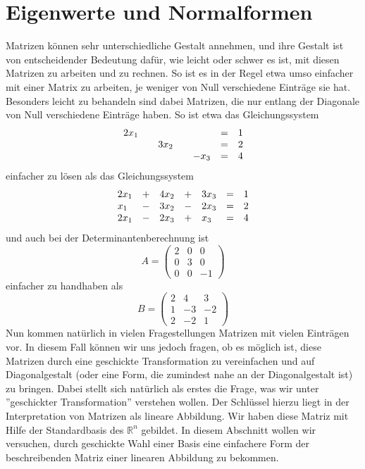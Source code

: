 
\chapter{Eigenwerte und Normalformen}\label{section_eigenwert}

\setcounter{definition}{0}
\setcounter{beispiel}{0}
\setcounter{notiz}{0}

Matrizen können sehr unterschiedliche Gestalt annehmen, und ihre Gestalt ist von 
entscheidender Bedeutung dafür, wie leicht oder schwer es ist, mit diesen Matrizen 
zu arbeiten und zu rechnen. So ist es in der Regel etwa umso einfacher mit einer 
Matrix zu arbeiten, je weniger von Null verschiedene Einträge sie hat. Besonders 
leicht zu behandeln sind dabei Matrizen, die nur entlang der Diagonale von Null 
verschiedene Einträge haben. So ist etwa das Gleichungssystem
  	$$ \begin{array} {l c l c l c l}
   	2 x_1 & & & & & = & 1 \\
   	& & 3 x_2 & & & = & 2 \\
   	& & & & - x_3 & = & 4
  	\end{array} $$
einfacher zu lösen als das Gleichungssystem
  	$$  \begin{array} {l c l c l c l}
   	2 x_1 & + & 4 x_2 & + & 3 x_3& = & 1 \\
   	x_1 & - & 3 x_2 & - & 2 x_3 & = & 2 \\
   	2x_1 & - & 2 x_3 & + & x_3 & = & 4
  	\end{array} $$
und auch bei der Determinantenberechnung ist 
  	$$ A = \left( \begin{matrix} 2 & 0 & 0 \\ 0 & 3 & 0 \\ 0 & 0 & -1 \end{matrix} \right) $$
einfacher zu handhaben als
  	$$ B = \left( \begin{matrix} 2 & 4 & 3 \\  1 & -3 & -2 \\ 2 & -2 & 1 \end{matrix} \right) $$ 
Nun kommen natürlich in vielen Fragestellungen Matrizen mit vielen Einträgen vor. 
In diesem Fall können wir uns jedoch fragen, ob es möglich ist, diese Matrizen 
durch eine geschickte Transformation zu vereinfachen und auf Diagonalgestalt (oder 
eine Form, die zumindest nahe an der Diagonalgestalt ist) zu bringen. Dabei stellt sich 
natürlich als erstes die Frage, was wir unter ''geschickter Transformation'' verstehen 
wollen. Der Schlüssel hierzu liegt in der Interpretation von Matrizen als lineare 
Abbildung. Wir haben diese Matriz mit Hilfe der Standardbasis des $\mathbb R^n$ 
gebildet. In diesem Abschnitt wollen wir versuchen, durch geschickte Wahl einer Basis 
eine einfachere Form der beschreibenden Matriz einer linearen Abbildung zu bekommen. 
 
